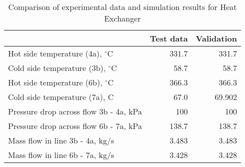\begin{table}
\label{tab:Comparison}
\caption{Comparison of experimental data and simulation results for Heat Exchanger}
\begin{center}
\begin{tabulary}{0.9\textwidth}{LRR}
\toprule
& Test data \cite{Iverson_2013}  & Validation \\
\midrule
Hot side temperature (4a), $^\circ$C & 331.7 & 331.7 \\
Cold side temperature (3b), $^\circ$C & 58.7 & 58.7 \\
Hot side temperature (6b), $^\circ$C & 366.3 & 366.3 \\
Cold side temperature (7a), C & 67.0 & 69.902 \\
Pressure drop across flow 3b - 4a, kPa & 100 & 100 \\
Pressure drop across flow 6b - 7a, kPa & 138.7 & 138.7 \\
Mass flow in line 3b - 4a, kg/s & 3.483 & 3.483 \\
Mass flow in line 6b - 7a, kg/s & 3.428 & 3.428 \\
\bottomrule
\end{tabulary}
\end{center}
\end{table}